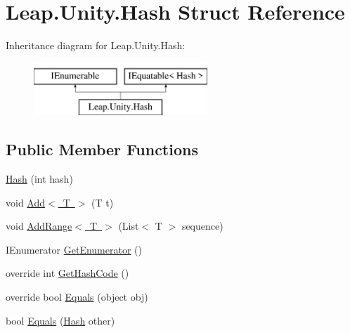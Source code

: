 \hypertarget{struct_leap_1_1_unity_1_1_hash}{}\section{Leap.\+Unity.\+Hash Struct Reference}
\label{struct_leap_1_1_unity_1_1_hash}
Inheritance diagram for Leap.\+Unity.\+Hash\+:\begin{figure}[H]
\begin{center}
\leavevmode
\includegraphics[height=2.000000cm]{struct_leap_1_1_unity_1_1_hash}
\end{center}
\end{figure}
\subsection*{Public Member Functions}
\begin{DoxyCompactItemize}
\item 
\mbox{\hyperlink{struct_leap_1_1_unity_1_1_hash_afaa1c83436400dc4f74450e95d278689}{Hash}} (int hash)
\item 
void \mbox{\hyperlink{struct_leap_1_1_unity_1_1_hash_a0bfae32cff62bebe9947c6aabea3d04f}{Add$<$ T $>$}} (T t)
\item 
void \mbox{\hyperlink{struct_leap_1_1_unity_1_1_hash_a3858e9f1fe271cbde1c5d223409187bb}{Add\+Range$<$ T $>$}} (List$<$ T $>$ sequence)
\item 
I\+Enumerator \mbox{\hyperlink{struct_leap_1_1_unity_1_1_hash_acbae9a5f2f31c33d8f0bc770a3bc60a1}{Get\+Enumerator}} ()
\item 
override int \mbox{\hyperlink{struct_leap_1_1_unity_1_1_hash_aefa4c7403803016313cd689201ee35e1}{Get\+Hash\+Code}} ()
\item 
override bool \mbox{\hyperlink{struct_leap_1_1_unity_1_1_hash_ab0efc09e8430daada3c57955b9d8a6da}{Equals}} (object obj)
\item 
bool \mbox{\hyperlink{struct_leap_1_1_unity_1_1_hash_a1e99f703a48e5e4087b2b284abd2a887}{Equals}} (\mbox{\hyperlink{struct_leap_1_1_unity_1_1_hash}{Hash}} other)
\end{DoxyCompactItemize}
